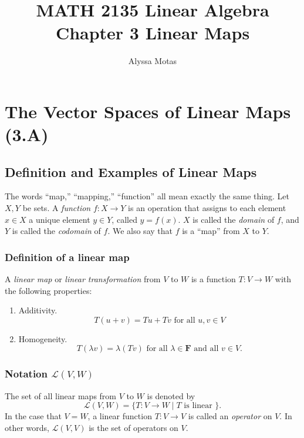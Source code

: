 \documentclass[11pt]{article}
\title{\textbf{MATH 2135 Linear Algebra} \\ Chapter 3 Linear Maps}
\author{Alyssa Motas}
\begin{document}
    \maketitle

    \pagebreak

    \tableofcontents

    \pagebreak

    \section{The Vector Spaces of Linear Maps (3.A)}

    \subsection{Definition and Examples of Linear Maps}

    The words ``map,'' ``mapping,'' ``function'' all mean exactly the same thing. Let $X,Y$ be sets. A \emph{function} \(f:X \rightarrow Y\) is an operation that assigns to each element \(x \in X\) a unique element \(y \in Y\), called \(y = f(x)\). $X$ is called the \emph{domain} of $f$, and $Y$ is called the \emph{codomain} of $f$. We also say that $f$ is a ``map'' from $X$ to $Y$.

    \subsubsection{Definition of a linear map}

    A \emph{linear map} or \emph{linear transformation} from $V$ to $W$ is a function \(T:V \rightarrow W\) with the following properties:
    \begin{enumerate}
        \item Additivity. \[T(u+v) = Tu + Tv \text{ for all } u,v \in V\]
        \item Homogeneity. \[T(\lambda v) = \lambda (Tv) \text{ for all } \lambda \in \textbf{F} \text{ and all } v \in V.\]
    \end{enumerate}

    \subsubsection{Notation \(\mathcal{L}(V,W)\)}

    The set of all linear maps from $V$ to $W$ is denoted by \[\mathcal{L}(V,W) = \{T:V \rightarrow W \mid T \text{ is linear }\}.\] In the case that \(V=W\), a linear function \(T:V \rightarrow V\) is called an \emph{operator} on $V$. In other words, \(\mathcal{L}(V,V)\) is the set of operators on $V$.
\end{document}
